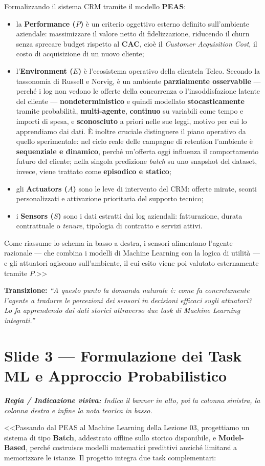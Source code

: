 \documentclass[10pt, a4paper]{article}
\newcommand{\cue}[1]{%
  \par\vspace{2pt}\noindent\colorbox{CueBg}{\parbox{\dimexpr\linewidth-2\fboxsep}{\footnotesize\textit{\color{PrimaryNavy}\textbf{Regia / Indicazione visiva:} #1}}}\par\vspace{3pt}%
}
\newcommand{\transition}[1]{%
  \par\vspace{2pt}\noindent\colorbox{LightBg}{\parbox{\dimexpr\linewidth-2\fboxsep}{\small\textbf{\color{SecondaryBlue}Transizione:} \textit{``#1''}}}\par\vspace{4pt}%
}
\begin{document}
Formalizzando il sistema CRM tramite il modello \textbf{PEAS}:
\begin{itemize}
    \item la \textbf{Performance ($P$)} è un criterio oggettivo esterno definito sull'ambiente aziendale: massimizzare il valore netto di fidelizzazione, riducendo il churn senza sprecare budget rispetto al \textbf{CAC}, cioè il \textit{Customer Acquisition Cost}, il costo di acquisizione di un nuovo cliente;
    \item l'\textbf{Environment ($E$)} è l'ecosistema operativo della clientela Telco. Secondo la tassonomia di Russell e Norvig, è un ambiente \textbf{parzialmente osservabile} --- perché i log non vedono le offerte della concorrenza o l'insoddisfazione latente del cliente --- \textbf{nondeterministico} e quindi modellato \textbf{stocasticamente} tramite probabilità, \textbf{multi-agente}, \textbf{continuo} su variabili come tempo e importi di spesa, e \textbf{sconosciuto} a priori nelle sue leggi, motivo per cui lo apprendiamo dai dati. È inoltre cruciale distinguere il piano operativo da quello sperimentale: nel ciclo reale delle campagne di retention l'ambiente è \textbf{sequenziale e dinamico}, perché un'offerta oggi influenza il comportamento futuro del cliente; nella singola predizione \textit{batch} su uno snapshot del dataset, invece, viene trattato come \textbf{episodico e statico};
    \item gli \textbf{Actuators ($A$)} sono le leve di intervento del CRM: offerte mirate, sconti personalizzati e attivazione prioritaria del supporto tecnico;
    \item i \textbf{Sensors ($S$)} sono i dati estratti dai log aziendali: fatturazione, durata contrattuale o \textit{tenure}, tipologia di contratto e servizi attivi.
\end{itemize}
Come riassume lo schema in basso a destra, i sensori alimentano l'agente razionale --- che combina i modelli di Machine Learning con la logica di utilità --- e gli attuatori agiscono sull'ambiente, il cui esito viene poi valutato esternamente tramite $P$.>>
\transition{A questo punto la domanda naturale è: come fa concretamente l'agente a tradurre le percezioni dei sensori in decisioni efficaci sugli attuatori? Lo fa apprendendo dai dati storici attraverso due task di Machine Learning integrati.}

\section*{Slide 3 --- Formulazione dei Task ML e Approccio Probabilistico}
\cue{Indica il banner in alto, poi la colonna sinistra, la colonna destra e infine la nota teorica in basso.}
\noindent <<Passando dal PEAS al Machine Learning della Lezione 03, progettiamo un sistema di tipo \textbf{Batch}, addestrato offline sullo storico disponibile, e \textbf{Model-Based}, perché costruisce modelli matematici predittivi anziché limitarsi a memorizzare le istanze. Il progetto integra due task complementari:
\end{document}
